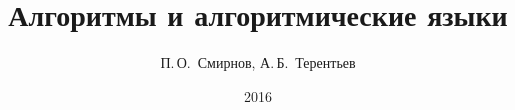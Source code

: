 
\makeatletter
\newcommand{\ministry}[1]{\gdef\@ministry{#1}}
\newcommand{\institution}[1]{\gdef\@institution{#1}}
\newcommand{\city}[1]{\gdef\@city{#1}}
\newcommand{\subtitle}[1]{\gdef\@subtitle{#1}}
\renewcommand{\@maketitle}{%
  \let\footnote\@mem@titlefootkill
  \ifdim\pagetotal>\z@
    \newpage
  \fi
  \null
  {\begin{center}\textbf{\@ministry}\\\rule{2cm}{1pt}\\[.5em] %
  \textbf{\MakeUppercase{\@institution}}\\\rule{\textwidth}{1pt}\end{center}}
  {\begin{center}\textbf{\textit{\MakeUppercase{\@author}}} \par\end{center}\vfill}
  {\begin{center}\Large\textbf{\MakeUppercase{\@title}} \par\end{center}}
  {\begin{center}\vskip.5cm \large\textbf{\textit{\@subtitle}} \par\end{center}\vfill\vfill}
  {\begin{center}\textbf{\@city\\\@date} \par\end{center}}
  \par}
\makeatother

\begin{titlingpage}
\let\cleardoublepage\clearpage
\ministry{Министерство образования и науки Российской Федерации}
\institution{Санкт-Петербургский политехнический\protect\\ университет Петра Великого}
\title{Алгоритмы и алгоритмические языки}
\subtitle{Лабораторный практикум}
\author{П.\,О.~Смирнов, А.\,Б.~Терентьев}
\city{Санкт-Петербург\\%
Издательство Политехнического университета%
}
\date{2016}%
\maketitle
\end{titlingpage}


